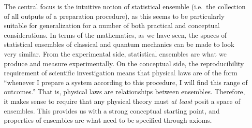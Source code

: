  

The central focus is the intuitive notion of statistical ensemble (i.e.~the collection of all outputs of a preparation procedure), as this seems to be particularly suitable for generalization for a number of both practical and conceptual considerations. In terms of the mathematics, as we have seen, the spaces of statistical ensembles of classical and quantum mechanics can be made to look very similar. From the experimental side, statistical ensembles are what we produce and measure experimentally. On the conceptual side, the reproducibility requirement of scientific investigation means that physical laws are of the form ``whenever I prepare a system according to this procedure, I will find this range of outcomes.'' That is, physical laws are relationships between ensembles. Therefore, it makes sense to require that any physical theory must \emph{at least} posit a space of ensembles. This provides us with a strong conceptual starting point, and properties of ensembles are what need to be specified through axioms.

